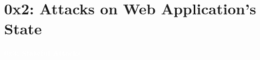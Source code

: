 \documentclass[aspectratio=169]{beamer}
\begin{document}
%
%


\section{0x2: Attacks on Web Application's State}
{
\begin{frame}
\huge{\textcolor{white}{\textbf{0x3: Stateful Attacks}}}
\end{frame}
}
\end{document}
